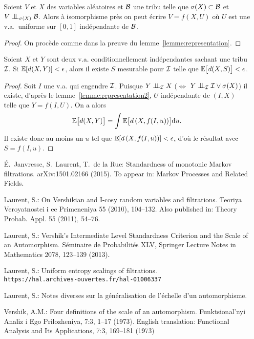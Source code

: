 \documentclass[12pt,a4paper]{article}
\begin{document}
\begin{appendices}
\begin{lemme}
Soient $V$ et $X$ des variables aléatoires et $\mathcal{B}$ une tribu telle que 
$\sigma(X) \subset \mathcal{B}$ et  $V \indep_{\sigma(X)} \BB$. 
Alors à isomorphisme près on peut écrire 
$V = f(X, U)$ où $U$ est une v.a.\ uniforme sur 
$[0,1]$ indépendante de $\mathcal{B}$. 
\end{lemme}

\begin{proof}
On procède comme dans la preuve du lemme~\ref{lemme:representation}. 
\end{proof}

\begin{lemme}\label{lemme:desintegr}
Soient $X$ et $Y$ sont deux v.a. conditionnellement indépendantes sachant une tribu $\mathcal{I}$. 
Si $\mathbb{E}[d(X,Y)] < \epsilon$, alors il existe $S$ mesurable pour $\mathcal{I}$ telle que $\mathbb{E}\bigl[d(X,S)\bigr] < \epsilon$.
\end{lemme}

\begin{proof}
Soit $I$  une v.a. qui engendre $\mathcal{I}$. Puisque 
$Y \indep_\II X$ ($\iff$ $Y \indep_{\II} \II \vee \sigma(X)$)
 il existe, d'après le lemme~\ref{lemme:representation2}, 
  $U$ indépendante de $(I,X)$ telle que $Y=f(I,U)$. On a alors 
$$
\mathbb{E}\bigl[d(X,Y)\bigr] = \int \mathbb{E}\bigl[d\left(X, f(I, u)\right)\bigr]\mathrm{d}u.
$$
Il existe donc au moins un $u$ tel que $\mathbb{E}[d\left(X, f(I, u)\right)] < \epsilon$, 
d'où le résultat avec $S=f(I,u)$. 
\end{proof}
\end{appendices}

\begin{thebibliography}{99.}

\'E.~Janvresse, S.~Laurent, T.~de la Rue: 
Standardness of monotonic Markov filtrations. 
	arXiv:1501.02166 (2015). 
To appear in: Markov Processes and Related Fields. 


 Laurent, S.: 
On Vershikian and I-cosy random variables and filtrations.
Teoriya Veroyatnostei i ee Primeneniya 55 (2010), 104--132. 
Also published in: Theory Probab. Appl. 55 (2011), 54--76.


Laurent, S.: 
Vershik's Intermediate Level Standardness Criterion and the Scale of an Automorphism. 
S\'eminaire de Probabilit\'es XLV,
Springer Lecture Notes in Mathematics 2078,
123--139 (2013).

Laurent, S.: 
Uniform entropy scalings of filtrations. \\
\verb+https://hal.archives-ouvertes.fr/hal-01006337+ 

Laurent, S.: 
Notes diverses sur la généralisation de l'échelle d'un automorphisme. 

Vershik, A.M.: 
Four definitions of the scale of an automorphism. 
Funktsional'nyi Analiz i Ego Prilozheniya, 7:3, 
1--17 (1973). 
English translation:    
Functional Analysis and Its Applications, 7:3, 169--181 (1973)


\end{thebibliography}
\end{document}
